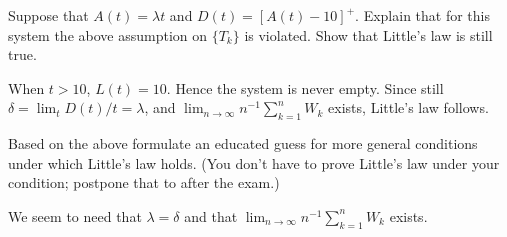 \begin{exercise}
  Suppose that $A(t) = \lambda t$ and $D(t)= [A(t) - 10]^+$.
  Explain that for this system the above assumption on $\{T_k\}$ is violated. Show that Little's law is still true.
\begin{solution}
  When $t>10$, $L(t) = 10$.
  Hence the system is never empty.
  Since still $\delta=\lim_t D(t)/t = \lambda$, and $\lim_{n\to \infty} n^{-1}\sum_{k=1}^n W_k$ exists, Little's law follows.
\end{solution}
\end{exercise}

\begin{exercise}
  Based on the above formulate an educated guess for more general conditions under which Little's law holds.
  (You don't have to prove Little's law under your condition; postpone that to after the exam.)
\begin{solution}
We seem to need that $\lambda = \delta$ and that  $\lim_{n\to \infty} n^{-1}\sum_{k=1}^n W_k$ exists. 
\end{solution}
\end{exercise}








